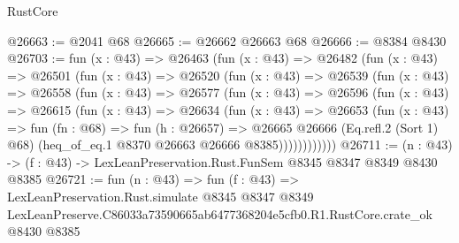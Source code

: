 \begin{lexlean}{RustCore}
\begin{coremodule}
@26663 := @2041 @68
@26665 := @26662 @26663 @68
@26666 := @8384 @8430
@26703 := fun (x : @43) =>
  @26463
    (fun (x : @43) =>
    @26482
      (fun (x : @43) =>
      @26501
        (fun (x : @43) =>
        @26520
          (fun (x : @43) =>
          @26539
            (fun (x : @43) =>
            @26558
              (fun (x : @43) =>
              @26577
                (fun (x : @43) =>
                @26596
                  (fun (x : @43) =>
                  @26615
                    (fun (x : @43) =>
                    @26634
                      (fun (x : @43) =>
                      @26653
                        (fun (x : @43) =>
                        fun (fn : @68) =>
                        fun (h : @26657) =>
                        @26665
                          @26666
                          (Eq.refl.{2} (Sort 1) @68)
                          (heq_of_eq.{1} @8370 @26663 @26666 @8385))))))))))))
@26711 := (n : @43) -> (f : @43) -> LexLeanPreservation.Rust.FunSem @8345 @8347 @8349 @8430 @8385
@26721 := fun (n : @43) =>
  fun (f : @43) =>
  LexLeanPreservation.Rust.simulate
    @8345
    @8347
    @8349
    LexLeanPreserve.C86033a73590665ab6477368204e5cfb0.R1.RustCore.crate_ok
    @8430
    @8385
\end{coremodule}
\end{lexlean}
